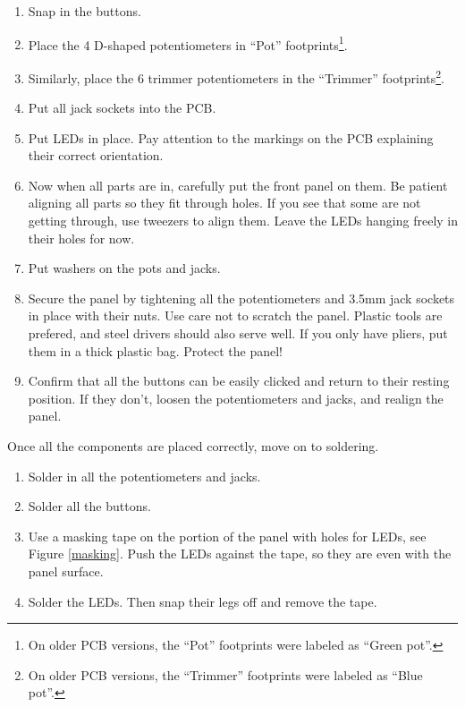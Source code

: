 \documentclass[10pt,a4paper,twocolumn]{article}
\begin{document}
\begin{enumerate}
  \item Snap in the buttons.
  \item Place the 4 D-shaped potentiometers in ``Pot''
    footprints\footnote{On older PCB versions, the ``Pot'' footprints
    were labeled as ``Green pot''.}.
  \item Similarly, place the 6 trimmer potentiometers in the ``Trimmer''
    footprints\footnote{On older PCB versions, the ``Trimmer'' footprints were
    labeled as ``Blue pot''.}.
  \item Put all jack sockets into the PCB.
  \item Put LEDs in place. Pay attention to the markings on the PCB explaining
    their correct orientation.
  \item Now when all parts are in, carefully put the front panel on them.
    Be patient aligning all parts so they fit through holes. If you see that
    some are not getting through, use tweezers to align them. Leave the LEDs
    hanging freely in their holes for now.
  \item Put washers on the pots and jacks.
  \item Secure the panel by tightening all the potentiometers and 3.5mm jack
    sockets in place with their nuts. Use care not to scratch the panel. Plastic
    tools are prefered, and steel drivers should also serve well. If you only
    have pliers, put them in a thick plastic bag. Protect the panel!
  \item Confirm that all the buttons can be easily clicked and return to their
    resting position. If they don't, loosen the potentiometers and jacks, and
    realign the panel.
\end{enumerate}

Once all the components are placed correctly, move on to soldering.

\begin{enumerate}
  \item Solder in all the potentiometers and jacks.
  \item Solder all the buttons.
  \item Use a masking tape on the portion of the panel with holes for LEDs, see
    Figure \ref{masking}. Push the LEDs against the tape, so they are even with
    the panel surface.
  \item Solder the LEDs. Then snap their legs off and remove the tape.
\end{enumerate}
\end{document}
